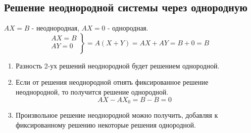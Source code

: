 \documentclass[a4paper, 12pt]{report}
\begin{document}
\subsection*{Решение неоднородной системы через однородную}
$AX=B$ - неоднородная, $AX=0$ - однородная.
$$\left.
  \begin{array}{ccc}
    AX=B \\
    AY=0 \\
  \end{array}
\right\}=A(X+Y)=AX+AY=B+0=B$$
\begin{enumerate}
    \item Разность 2-ух решений неоднородной будет решением однородной.
    \item Если от решения неоднородной отнять фиксированное решение неоднородной, то получится решение однородной.
    $$AX-AX_0=B-B=0$$
    \item Произвольное решение неоднородной можно получить, добавляя к фиксированному решению некоторые решения однородной.
\end{enumerate}
\end{document}

